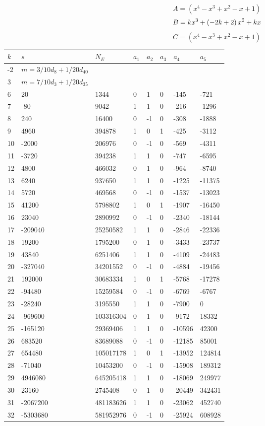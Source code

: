 \documentclass{amsart}
\begin{document}
$$A=(x^4
 - x^3
 + x^2
 - x
 + 1)$$
$$B=k\*x^3
 + \left(-2\*k
 + 2\right) \*x^2
 + k\*x$$
$$C=(x^4
 - x^3
 + x^2
 - x
 + 1)$$
\begin{longtable}{|l|l|l|lllll|}
\hline
$k$ & $s$ & $N_E$ & $a_1$ & $a_2$ & $a_3$ & $a_4$ & $a_5$\\
\hline
-2&$m=3/10d_{8}+1/20d_{40}$&&\multicolumn{5}{c|}{}\\
3&$m=7/10d_{3}+1/20d_{35}$&&\multicolumn{5}{c|}{}\\
6&20&1344&0&1&0&-145&-721\\
7&-80&9042&1&1&0&-216&-1296\\
8&240&16400&0&-1&0&-308&-1888\\
9&4960&394878&1&0&1&-425&-3112\\
10&-2000&206976&0&-1&0&-569&-4311\\
11&-3720&394238&1&1&0&-747&-6595\\
12&4800&466032&0&1&0&-964&-8740\\
13&6240&937650&1&1&0&-1225&-11375\\
14&5720&469568&0&-1&0&-1537&-13023\\
15&41200&5798802&1&0&1&-1907&-16450\\
16&23040&2890992&0&-1&0&-2340&-18144\\
17&-209040&25250582&1&1&0&-2846&-22336\\
18&19200&1795200&0&1&0&-3433&-23737\\
19&43840&6251406&1&1&0&-4109&-24483\\
20&-327040&34201552&0&-1&0&-4884&-19456\\
21&192000&30683334&1&0&1&-5768&-17278\\
22&-94480&15259584&0&-1&0&-6769&-6767\\
23&-28240&3195550&1&1&0&-7900&0\\
24&-969600&103316304&0&1&0&-9172&18332\\
25&-165120&29369406&1&1&0&-10596&42300\\
26&683520&83689088&0&-1&0&-12185&85001\\
27&654480&105017178&1&0&1&-13952&124814\\
28&-71040&10453200&0&-1&0&-15908&189312\\
29&4946080&645205418&1&1&0&-18069&249977\\
30&23160&2745408&0&1&0&-20449&342431\\
31&-2067200&481183626&1&1&0&-23062&452740\\
32&-5303680&581952976&0&-1&0&-25924&608928\\

\end{longtable}
\end{document}
